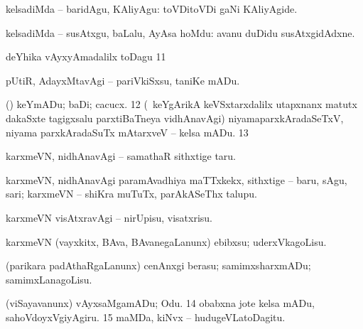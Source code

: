 {{  kelsadiMda -- baridAgu,
 KAliyAgu:  toVDitoVDi gaNi
 KAliyAgide. 

  kelsadiMda -- susAtxgu, baLalu, AyAsa hoMdu:
  avanu duDidu
 susAtxgidAdxne. 

  deYhika vAyxyAmadalilx toDagu 
\num{11}

  pUtiR, AdayxMtavAgi -- pariVkiSxsu, taniKe
 mADu. 

  (\AmA) keYmADu; baDi; cacucx. 
\num{12} (\kanmu\ keYgArikA keVSxtarxdalilx utapxnanx matutx dakaSxte
 tagigxsalu parxtiBaTneya vidhAnavAgi) niyamaparxkAradaSeTxV, niyama
 parxkAradaSuTx mAtarxveV -- kelsa mADu. 
\num{13}  

 karxmeVN, nidhAnavAgi -- samathaR sithxtige taru. 

 karxmeVN, nidhAnavAgi paramAvadhiya maTTxkekx, sithxtige -- baru,
 sAgu, sari; karxmeVN -- shiKra muTuTx, parAkASeThx talupu. 

 karxmeVN visAtxravAgi -- nirUpisu, visatxrisu. 

  karxmeVN
 (vayxkitx, BAva, BAvanegaLanunx) ebibxsu; uderxVkagoLisu. 

 (parikara padAthaRgaLanunx) cenAnxgi berasu; samimxsharxmADu;
 samimxLanagoLisu. 

  (viSayavanunx) vAyxsaMgamADu;
 Odu. 
\num{14}  obabxna jote kelsa mADu,
 sahoVdoyxVgiyAgiru. 
\num{15}  maMDa,
 kiNvx -- hudugeVLatoDagitu.}}
\eentry

\bentry
{}
\gl{\saupa} 
\eentry

\bentry
{} 
\gl{\nA}
\eentry

\bentry
{} 
\gl{\gu} 
\eentry

